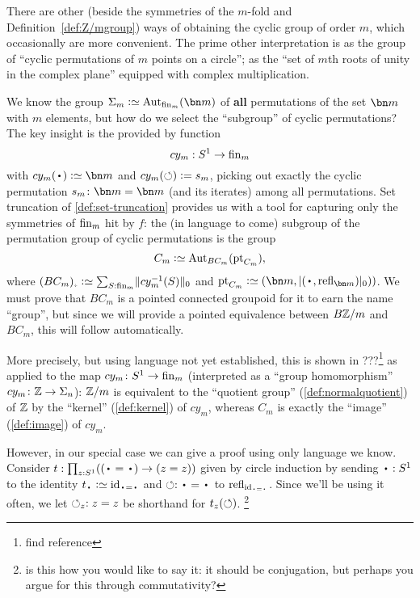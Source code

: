 \begin{example}

There are other (beside the symmetries of the $m$-fold \covering and Definition~\ref{def:Z/mgroup}) ways of obtaining the cyclic group of order $m$, which occasionally are more convenient.  The prime other interpretation is as the group of ``cyclic permutations of $m$ points on a circle''; \ie as the ``set of $m$th roots of unity in the complex plane'' equipped with complex multiplication.  

We know the group $\Sigma_m\defequi\aut_{\fin_m}(\bn m)$ of {\bf all} permutations of the set $\bn m$ with $m$ elements, but how do we select the ``subgroup'' of cyclic permutations?  
The key insight is the provided by function 
$$cy_m:S^1\to\fin_m$$ 
with $cy_m(\base)\defequi\bn m$ and 
$cy_m(\circlearrowleft)\mathrel{\vcentcolon=} s_m$, picking out exactly the cyclic permutation $s_m\colon\bn m=\bn m$ (and its iterates) among all permutations.  Set truncation of \cref{def:set-truncation} provides us with a tool for capturing only the symmetries of $\fin_m$ hit by $f$: the (in language to come) subgroup of the permutation group of cyclic permutations is the group
$$C_m\defequi\aut_{BC_m}(\pt_{C_m}),$$
where $(BC_m)_\div\defequi \sum_{S:\fin_m}\Trunc{cy_m^{-1}(S)}_0$ and $\pt_{C_m}\defequi (\bn m,\trunc{(\base,\refl{\bn m})}_0))$.  We must prove that $BC_m$ is a pointed connected groupoid for it to earn the name ``group'', but since we will provide a pointed equivalence between $B\mathbb{Z}/m$ and $BC_m$, this will follow automatically.

More precisely, but using language not yet established, this is shown in ???\footnote{find reference} as applied to the map $cy_m\colon S^1\to\fin_m$ (interpreted as a ``group homomorphism'' $cy_m\colon \mathbb{Z}\to\Sigma_n$): $\mathbb{Z}/m$ is equivalent to the ``quotient group'' (\cf \cref{def:normalquotient}) of $\mathbb{Z}$ by the ``kernel'' (\cf \cref{def:kernel}) of $cy_m$, whereas $C_m$ is exactly the ``image'' (\cf \cref{def:image}) of $cy_m$.  

However, in our special case we can give a proof using only language we know.
Consider $t:\prod_{z:S^1}((\base=\base)\to(z=z))$ given by circle induction by sending $\base:S^1$ to the identity $t_\base\defequi\id_{\base=\base}$ and $\Sloop:\base=\base$ to $\refl{\id_{\base=\base}}$.
Since we'll be using it often, we let $\circlearrowleft_z:z=z$ be shorthand for $t_z(\circlearrowleft)$.
\footnote{is this how you would like to say it: it should be conjugation, but perhaps you argue for this through commutativity?} 


\end{example}
